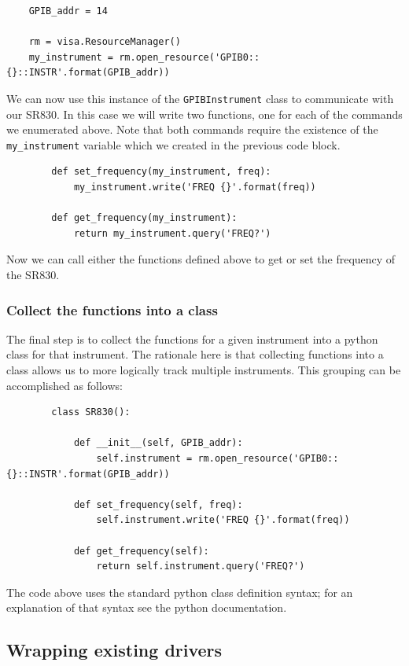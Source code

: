 \documentclass[edeposit,fullpage,draftthesis]{uiucthesis2009}
\begin{document}
\begin{appendices}
\begin{verbatim}
    GPIB_addr = 14
    
    rm = visa.ResourceManager()
    my_instrument = rm.open_resource('GPIB0::{}::INSTR'.format(GPIB_addr))
    \end{verbatim}
    We can now use this instance of the \texttt{GPIBInstrument} class to communicate with our SR830.
    In this case we will write two functions, one for each of the commands we enumerated above.
    Note that both commands require the existence of the \texttt{my\_instrument} variable which
    we created in the previous code block.
    \begin{verbatim}
        def set_frequency(my_instrument, freq):
            my_instrument.write('FREQ {}'.format(freq))
            
        def get_frequency(my_instrument):
            return my_instrument.query('FREQ?')
    \end{verbatim}
    Now we can call either the functions defined above to get or set the frequency of the SR830.
    
    \subsubsection*{Collect the functions into a class}
    
    The final step is to collect the functions for a given instrument into a python class for that instrument.
    The rationale here is that collecting functions into a class allows us to more logically track multiple
    instruments. This grouping can be accomplished as follows:
    \begin{verbatim}
        class SR830():
        
            def __init__(self, GPIB_addr):
                self.instrument = rm.open_resource('GPIB0::{}::INSTR'.format(GPIB_addr))
                
            def set_frequency(self, freq):
                self.instrument.write('FREQ {}'.format(freq))
                
            def get_frequency(self):
                return self.instrument.query('FREQ?')
    \end{verbatim}
    The code above uses the standard python class definition syntax; for an explanation of that syntax see
    the python documentation.
    
    
    \subsection{Wrapping existing drivers}
    

\end{appendices}
\end{document}
